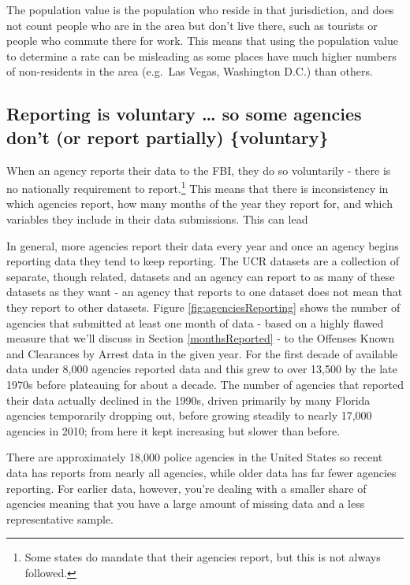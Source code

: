 \documentclass[
  12pt,
  openany]{book}
\begin{document}
The population value is the population who reside in that jurisdiction, and does not count people who are in the area but don't live there, such as tourists or people who commute there for work. This means that using the population value to determine a rate can be misleading as some places have much higher numbers of non-residents in the area (e.g.~Las Vegas, Washington D.C.) than others.

\hypertarget{reporting-is-voluntary-so-some-agencies-dont-or-report-partially-voluntary}{%
\subsection{Reporting is voluntary \ldots{} so some agencies don't (or report partially) \{voluntary\}}\label{reporting-is-voluntary-so-some-agencies-dont-or-report-partially-voluntary}}

When an agency reports their data to the FBI, they do so voluntarily - there is no nationally requirement to report.\footnote{Some states do mandate that their agencies report, but this is not always followed.} This means that there is inconsistency in which agencies report, how many months of the year they report for, and which variables they include in their data submissions. This can lead

In general, more agencies report their data every year and once an agency begins reporting data they tend to keep reporting. The UCR datasets are a collection of separate, though related, datasets and an agency can report to as many of these datasets as they want - an agency that reports to one dataset does not mean that they report to other datasets. Figure \ref{fig:agenciesReporting} shows the number of agencies that submitted at least one month of data - based on a highly flawed measure that we'll discuss in Section \ref{monthsReported} - to the Offenses Known and Clearances by Arrest data in the given year. For the first decade of available data under 8,000 agencies reported data and this grew to over 13,500 by the late 1970s before plateauing for about a decade. The number of agencies that reported their data actually declined in the 1990s, driven primarily by many Florida agencies temporarily dropping out, before growing steadily to nearly 17,000 agencies in 2010; from here it kept increasing but slower than before.

There are approximately 18,000 police agencies in the United States so recent data has reports from nearly all agencies, while older data has far fewer agencies reporting. For earlier data, however, you're dealing with a smaller share of agencies meaning that you have a large amount of missing data and a less representative sample.
\end{document}
